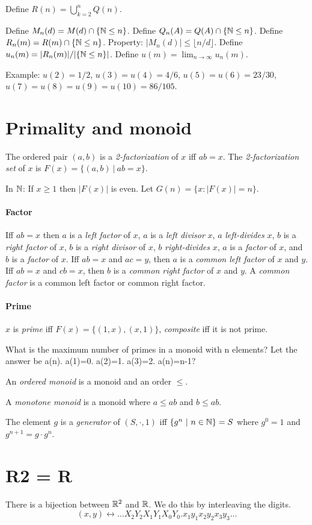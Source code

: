 Define \(R(n) = \bigcup_{k=2}^n Q(n)\).

Define \(M_n(d) = M(d) \cap \{\mathbb{N} \le n\}\).
Define \(Q_n(A) = Q(A) \cap \{\mathbb{N} \le n\}\).
Define \(R_n(m) = R(m) \cap \{\mathbb{N} \le n\}\).
Property: \(|M_n(d)| \le \lfloor n/d \rfloor\).
Define \(u_n(m) = |R_n(m)| / |\{\mathbb{N} \le n\}|\).
Define \(u(m) = \lim_{n \to \infty} u_n(m)\).

Example: \(u(2) = 1/2\), \(u(3) = u(4) = 4/6\), \(u(5) = u(6) = 23/30\), \(u(7) = u(8) = u(9) = u(10) = 86/105\).

\section{Primality and monoid}

The ordered pair \((a,b)\) is a \emph{2-factorization} of \(x\) iff \(ab = x\).
The \emph{2-factorization set} of \(x\) is \(F(x) = \{ (a,b) ~|~ ab = x \}\).

In \(\mathbb{N}\):
If \(x \ge 1\) then \(|F(x)|\) is even.
Let \(G(n) = \{ x : |F(x)| = n \}\).

\paragraph{Factor}
Iff \(ab = x\) then
\(a\) is a \emph{left factor} of \(x\),
\(a\) is a \emph{left divisor} \(x\),
\(a\) \emph{left-divides} \(x\),
\(b\) is a \emph{right factor} of \(x\),
\(b\) is a \emph{right divisor} of \(x\),
\(b\) \emph{right-divides} \(x\),
\(a\) is a \emph{factor} of \(x\),
and \(b\) is a \emph{factor} of \(x\).
Iff \(ab = x\) and \(ac = y\),
then \(a\) is a \emph{common left factor} of \(x\) and \(y\).
Iff \(ab = x\) and \(cb = x\),
then \(b\) is a \emph{common right factor} of \(x\) and \(y\).
A \emph{common factor} is a common left factor or common right factor.

\paragraph{Prime}
\(x\) is
\emph{prime} iff \(F(x) = \{(1,x),(x,1)\}\),
\emph{composite} iff it is not prime.

What is the maximum number of primes in a monoid with n elements?
Let the answer be a(n).
a(1)=0. a(2)=1. a(3)=2. a(n)=n-1?

An \emph{ordered monoid} is a monoid and an order \(\le\).

A \emph{monotone monoid} is a monoid where \(a \le ab\) and \(b \le ab\).

The element \(g\) is a
%
\emph{generator} of \((S,\cdot,1)\) iff \(\{g^n ~|~ n \in \mathbb{N}\} = S\)
where \(g^0 = 1\) and \(g^{n+1} = g \cdot g^n\).

\section{R2 = R}

There is a bijection between \(\mathbb{R}^2\) and \(\mathbb{R}\).
We do this by interleaving the digits.
\[
    (x, y) \leftrightarrow \ldots X_2 Y_2 X_1 Y_1 X_0 Y_0 . x_1 y_1 x_2 y_2 x_3 y_3 \ldots
\]
